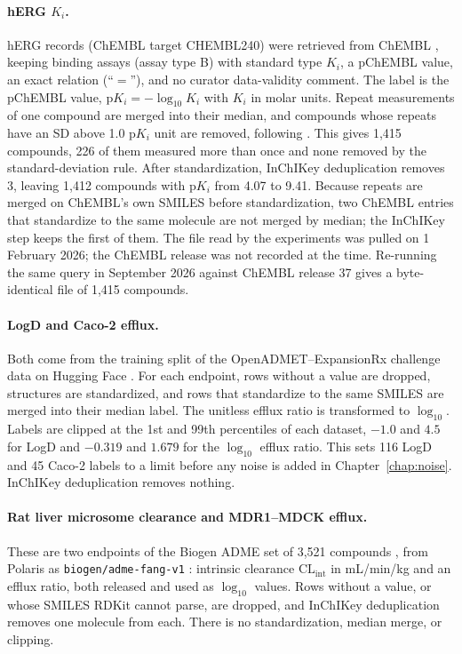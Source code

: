 \paragraph{\texorpdfstring{hERG $K_i$.}{hERG Ki.}} hERG records (ChEMBL target CHEMBL240) were retrieved from ChEMBL \citep{Zdrazil2023}, keeping binding assays (assay type B) with standard type $K_i$, a pChEMBL value, an exact relation (``$=$''), and no curator data-validity comment. The label is the pChEMBL value, $\mathrm{p}K_i = -\log_{10} K_i$ with $K_i$ in molar units. Repeat measurements of one compound are merged into their median, and compounds whose repeats have an SD above 1.0 p$K_i$ unit are removed, following \citet{landrum2024}. This gives 1,415 compounds, 226 of them measured more than once and none removed by the standard-deviation rule. After standardization, InChIKey deduplication removes 3, leaving 1,412 compounds with p$K_i$ from 4.07 to 9.41. Because repeats are merged on ChEMBL's own SMILES before standardization, two ChEMBL entries that standardize to the same molecule are not merged by median; the InChIKey step keeps the first of them. The file read by the experiments was pulled on 1 February 2026; the ChEMBL release was not recorded at the time. Re-running the same query in September 2026 against ChEMBL release 37 gives a byte-identical file of 1,415 compounds.

\paragraph{LogD and Caco-2 efflux.} Both come from the training split of the OpenADMET--ExpansionRx challenge data on Hugging Face \citep{openadmet}. For each endpoint, rows without a value are dropped, structures are standardized, and rows that standardize to the same SMILES are merged into their median label. The unitless efflux ratio is transformed to $\log_{10}$. Labels are clipped at the 1st and 99th percentiles of each dataset, $-1.0$ and $4.5$ for LogD and $-0.319$ and $1.679$ for the $\log_{10}$ efflux ratio. This sets 116 LogD and 45 Caco-2 labels to a limit before any noise is added in Chapter~\ref{chap:noise}. InChIKey deduplication removes nothing.

\paragraph{Rat liver microsome clearance and MDR1--MDCK efflux.} These are two endpoints of the Biogen ADME set of 3,521 compounds \citep{fang2023}, from Polaris as \texttt{biogen/adme-fang-v1} \citep{polaris}: intrinsic clearance $\mathrm{CL_{int}}$ in mL/min/kg and an efflux ratio, both released and used as $\log_{10}$ values. Rows without a value, or whose SMILES RDKit cannot parse, are dropped, and InChIKey deduplication removes one molecule from each. There is no standardization, median merge, or clipping.

